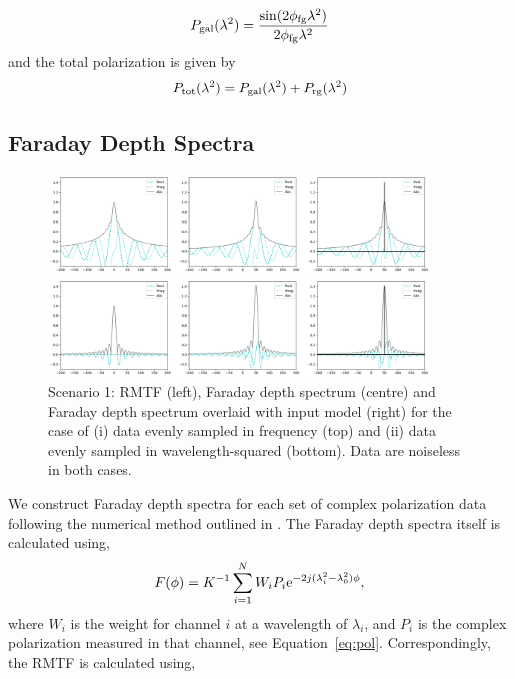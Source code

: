 \documentclass[fleqn,usenatbib]{mnras}
\begin{document}
\begin{equation}
P_{\rm gal}(\lambda^2) = \frac{\sin (2\phi_{\rm fg} \lambda^2)}{2\phi_{\rm fg}\lambda^2}
\end{equation}
%
and the total polarization is given by
%
\begin{equation}
P_{\rm tot}(\lambda^2) = P_{\rm gal}(\lambda^2) + P_{\rm rg}(\lambda^2)
\end{equation}

\subsection{Faraday Depth Spectra}
\label{sec:fdspectra}

%
\begin{figure}
\centerline{\includegraphics[width=0.9\textwidth]{./FIGURES/Scenario1_fsamp.png}}
\centerline{\includegraphics[width=0.9\textwidth]{./FIGURES/Scenario1_lsamp.png}}
\caption{\label{fig:scen1samp} Scenario 1: RMTF (left), Faraday depth spectrum (centre) and Faraday depth spectrum overlaid with input model (right) for the case of (i) data evenly sampled in frequency (top) and (ii) data evenly sampled in wavelength-squared (bottom). Data are noiseless in both cases.}
\end{figure}
%
We construct Faraday depth spectra for each set of complex polarization data following the numerical method outlined in \cite{2005A&A...441.1217B}. The Faraday depth spectra itself is calculated using,
%
\begin{equation}
F(\phi) = K^{-1}\sum_{i = 1}^{N}{W_i P_i {\rm e}^{-2j (\lambda_i^2 - \lambda_0^2) \phi}},
\end{equation}
%
where $W_i$ is the weight for channel $i$ at a wavelength of $\lambda_i$, and $P_i$ is the complex polarization measured in that channel, see Equation~\ref{eq:pol}. Correspondingly, the RMTF is calculated using,
\end{document}

